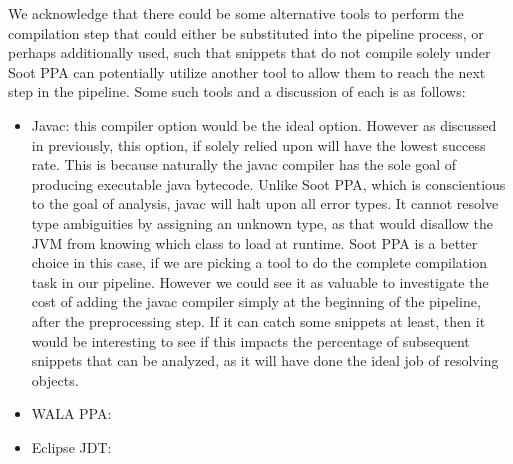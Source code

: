 \documentclass[10pt, conference]{IEEEtran}
\begin{document}
We acknowledge that there could be some alternative tools to perform the compilation step that could either be substituted into the pipeline process, or perhaps additionally used, such that snippets that do not compile solely under Soot PPA can potentially utilize another tool to allow them to reach the next step in the pipeline. Some such tools and a discussion of each is as follows:
\begin{itemize}
\item
Javac: this compiler option would be the ideal option. However as discussed in previously, this option, if solely relied upon will have the lowest success rate. This is because naturally the javac compiler has the sole goal of producing executable java bytecode. Unlike Soot PPA, which is conscientious to the goal of analysis, javac will halt upon all error types. It cannot resolve type ambiguities by assigning an unknown type, as that would disallow the JVM from knowing which class to load at runtime. Soot PPA is a better choice in this case, if we are picking a tool to do the complete compilation task in our pipeline. However we could see it as valuable to investigate the cost of adding the javac compiler simply at the beginning of the pipeline, after the preprocessing step. If it can catch some snippets at least, then it would be interesting to see if this impacts the percentage of subsequent snippets that can be analyzed, as it will have done the ideal job of resolving objects.
\item
WALA PPA:
\item
Eclipse JDT:
\end{itemize}
\end{document}
